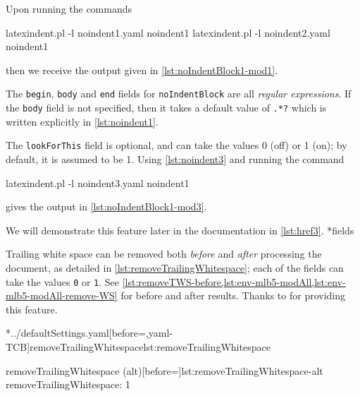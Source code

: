 	Upon running the commands
	\begin{commandshell}
latexindent.pl -l noindent1.yaml noindent1
latexindent.pl -l noindent2.yaml noindent1
\end{commandshell}
	then we receive the output given in \cref{lst:noIndentBlock1-mod1}.


	The \texttt{begin}, \texttt{body} and \texttt{end} fields
	for \texttt{noIndentBlock} are all \emph{regular expressions}. If the
	\texttt{body} field is not specified, then it takes a default value of
	\lstinline!.*?! which is written explicitly in \cref{lst:noindent1}.

	The \texttt{lookForThis} field is optional, and can take the values 0 (off) or 1 (on);
	by default, it is assumed to be 1. Using \cref{lst:noindent3} and running the command
	\begin{commandshell}
latexindent.pl -l noindent3.yaml noindent1
\end{commandshell}
	gives the output in \cref{lst:noIndentBlock1-mod3}.


	We will demonstrate this feature later in the documentation in \cref{lst:href3}.
*{fields}\label{yaml:removeTrailingWhitespace}

	Trailing white space can be removed both \emph{before} and
	\emph{after} processing the document, as detailed in \cref{lst:removeTrailingWhitespace};
	each of the fields can take the values \texttt{0} or
	\texttt{1}. See \vref{lst:removeTWS-before,lst:env-mlb5-modAll,lst:env-mlb5-modAll-remove-WS} for before and after results. Thanks
	to \cite{vosskuhle} for providing this feature.

	\begin{minipage}{.4\textwidth}
		\cmhlistingsfromfile[style=removeTrailingWhitespace]*{../defaultSettings.yaml}[before=\centering,yaml-TCB]{removeTrailingWhitespace}{lst:removeTrailingWhitespace}
	\end{minipage}%
	\hfill
	\begin{minipage}{.5\textwidth}
		\begin{yaml}[numbers=none]{removeTrailingWhitespace (alt)}[before=\centering]{lst:removeTrailingWhitespace-alt}
removeTrailingWhitespace: 1
\end{yaml}
	\end{minipage}%

